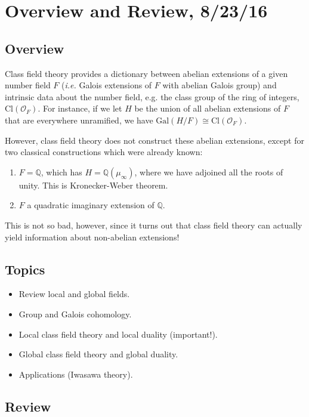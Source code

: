 \documentclass[letterpaper, 12pt]{article}
\newcommand{\ie}{{\it i.e. }}
\newcommand{\cl}[1]{{\mathrm{Cl}(#1)}}
\newcommand{\roi}[1]{\mathcal{O}_{#1}}
\newcommand{\gal}[3]{\mathrm{Gal}(#1 #2 #3)}
\newcommand{\iso}{\cong}
\newcommand{\rats}{\mathbb{Q}}
\begin{document}
\section{Overview and Review, 8/23/16}

\subsection{Overview} Class field theory provides a dictionary between abelian
extensions of a given number field $F$ (\ie Galois extensions of $F$ with
abelian Galois group) and intrinsic data about the number field, e.g. the
class group of the ring of integers, $\cl{\roi F}$. For instance, if we let
$H$ be the union of all abelian extensions of $F$ that are everywhere
unramified, we have $\gal H/F \iso \cl{\roi F}$.

However, class field theory does not construct these abelian extensions,
except for two classical constructions which were already known:
\begin{enumerate} 
\item $F = \rats$, which has $H = \rats(\mu_\infty)$, where
we have adjoined all the roots of unity. This is Kronecker-Weber theorem.
\item $F$ a quadratic imaginary extension of $\rats$.
\end{enumerate}
This is not so bad, however, since it turns out that class field theory can
actually yield information about non-abelian extensions!

\subsection{Topics}
\begin{itemize}
\item Review local and global fields.
\item Group and Galois cohomology.
\item Local class field theory and local duality (important!).
\item Global class field theory and global duality.
\item Applications (Iwasawa theory).
\end{itemize}

\subsection{Review}
\end{document}
